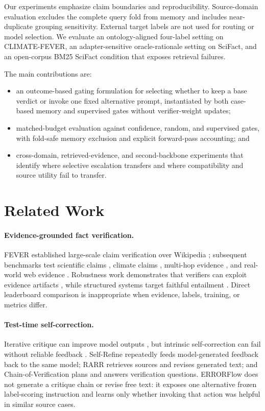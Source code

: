 \documentclass[runningheads]{llncs}
\begin{document}
Our experiments emphasize claim boundaries and reproducibility. Source-domain
evaluation excludes the complete query fold from memory and includes
near-duplicate grouping sensitivity. External target labels are not used for
routing or model selection. We evaluate an ontology-aligned four-label setting
on CLIMATE-FEVER, an adapter-sensitive oracle-rationale setting on SciFact,
and an open-corpus BM25 SciFact condition that exposes retrieval failures.

The main contributions are:
\begin{itemize}
  \item an outcome-based gating formulation for selecting whether to keep a
  base verdict or invoke one fixed alternative prompt, instantiated by both
  case-based memory and supervised gates without verifier-weight updates;
  \item matched-budget evaluation against confidence, random, and
  supervised gates, with fold-safe memory exclusion and explicit forward-pass
  accounting; and
  \item cross-domain, retrieved-evidence, and second-backbone experiments that
  identify where selective escalation transfers and where compatibility and
  source utility fail to transfer.
\end{itemize}

\section{Related Work}

\paragraph{Evidence-grounded fact verification.}
FEVER established large-scale claim verification over Wikipedia
\cite{thorne2018fever}; subsequent benchmarks test scientific claims
\cite{wadden2020scifact}, climate claims \cite{diggelmann2020climate},
multi-hop evidence \cite{jiang2020hover}, and real-world web evidence
\cite{schlichtkrull2024averitec}. Robustness work demonstrates that verifiers
can exploit evidence artifacts \cite{schuster2021vitaminc}, while structured
systems target faithful entailment \cite{krishna2022proofver}. Direct
leaderboard comparison is inappropriate when evidence, labels, training, or
metrics differ.

\paragraph{Test-time self-correction.}
Iterative critique can improve model outputs
\cite{madaan2023selfrefine,gao2023rarr,dhuliawala2024coverification}, but
intrinsic self-correction can fail without reliable feedback
\cite{huang2024cannot}. Self-Refine repeatedly feeds model-generated feedback
back to the same model; RARR retrieves sources and revises generated text; and
Chain-of-Verification plans and answers verification questions. ERRORFlow does
not generate a critique chain or revise free text: it exposes one alternative
frozen label-scoring instruction and learns only whether invoking that action
was helpful in similar source cases.
\end{document}
